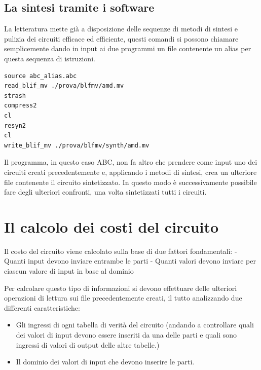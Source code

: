 \documentclass[
]{book}
\providecommand{\tightlist}{%
  \setlength{\itemsep}{0pt}\setlength{\parskip}{0pt}}
\begin{document}
\newpage

\hypertarget{la-sintesi-tramite-i-software}{%
\subsection{La sintesi tramite i software}\label{la-sintesi-tramite-i-software}}

La letteratura mette già a disposizione delle sequenze di metodi di sintesi e pulizia dei circuiti efficace ed efficiente, questi comandi si possono chiamare semplicemente dando in input ai due programmi un file contenente un alias per questa sequenza di istruzioni.

\begin{verbatim}
source abc_alias.abc
read_blif_mv ./prova/blfmv/amd.mv
strash
compress2
cl
resyn2
cl
write_blif_mv ./prova/blfmv/synth/amd.mv
\end{verbatim}

Il programma, in questo caso ABC, non fa altro che prendere come input uno dei circuiti creati precedentemente e, applicando i metodi di sintesi, crea un ulteriore file contenente il circuito sintetizzato. In questo modo è successivamente possibile fare degli ulteriori confronti, una volta sintetizzati tutti i circuiti.

\hypertarget{il-calcolo-dei-costi-del-circuito}{%
\section{Il calcolo dei costi del circuito}\label{il-calcolo-dei-costi-del-circuito}}

Il costo del circuito viene calcolato sulla base di due fattori fondamentali:
- Quanti input devono inviare entrambe le parti
- Quanti valori devono inviare per ciascun valore di input in base al dominio

Per calcolare questo tipo di informazioni si devono effettuare delle ulteriori operazioni di lettura sui file precedentemente creati, il tutto analizzando due differenti caratteristiche:

\begin{itemize}
\tightlist
\item
  Gli ingressi di ogni tabella di verità del circuito (andando a controllare quali dei valori di input devono essere inseriti da una delle parti e quali sono ingressi di valori di output delle altre tabelle.)
\item
  Il dominio dei valori di input che devono inserire le parti.
\end{itemize}
\end{document}
